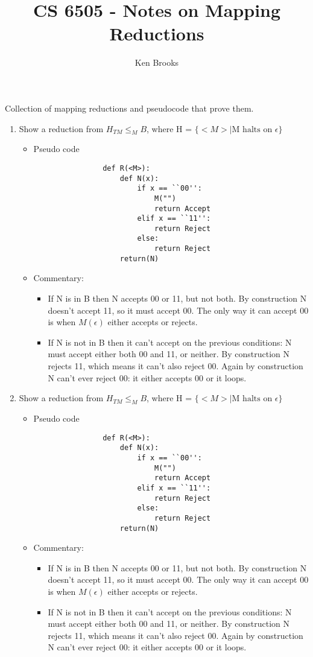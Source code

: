 \documentclass[12pt]{article}
\title{CS 6505 - Notes on Mapping Reductions}
\author{Ken Brooks}
\begin{document}
\lstset{language=Python, tabsize = 4}
Collection of mapping reductions and pseudocode that prove them.
\begin{enumerate}
	\item Show a reduction from $H_{TM} \leq_{M}B$, where H = $\{<M> \mid \mbox{M halts on } \epsilon\}$
		\begin{itemize}
			\item Pseudo code
				\begin{lstlisting}
				def R(<M>):
					def N(x):
						if x == ``00'':
							M("")
							return Accept
						elif x == ``11'':
							return Reject
						else:
							return Reject
					return(N)
				\end{lstlisting}
		\item Commentary:
			\begin{itemize}
				\item If N is in B then N accepts 00 or 11, but not both.  By construction N doesn't accept 11, so it must accept 00.  The only way it can accept 00 is when $M(\epsilon)$ either accepts or rejects.
				\item If N is not in B then it can't accept on the previous conditions: N must accept either both 00 and 11, or neither. By construction N rejects 11, which means it can't also reject 00. Again by construction N can't ever reject 00: it either accepts 00 or it loops.
			\end{itemize}
		\end{itemize}
	\item Show a reduction from $H_{TM} \leq_{M}B$, where H = $\{<M> \mid \mbox{M halts on } \epsilon\}$
		\begin{itemize}
			\item Pseudo code
				\begin{lstlisting}
				def R(<M>):
					def N(x):
						if x == ``00'':
							M("")
							return Accept
						elif x == ``11'':
							return Reject
						else:
							return Reject
					return(N)
				\end{lstlisting}
		\item Commentary:
			\begin{itemize}
				\item If N is in B then N accepts 00 or 11, but not both.  By construction N doesn't accept 11, so it must accept 00.  The only way it can accept 00 is when $M(\epsilon)$ either accepts or rejects.
				\item If N is not in B then it can't accept on the previous conditions: N must accept either both 00 and 11, or neither. By construction N rejects 11, which means it can't also reject 00. Again by construction N can't ever reject 00: it either accepts 00 or it loops.
			\end{itemize}
		\end{itemize}
\end{enumerate}
\end{document}

